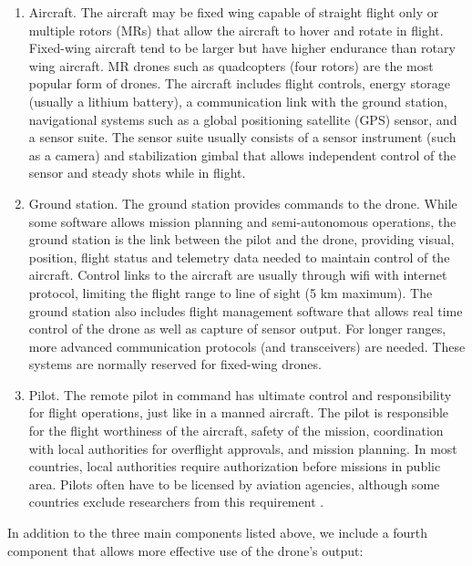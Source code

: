 \begin{enumerate}
\item Aircraft. The aircraft may be fixed wing capable of straight flight only or multiple rotors (MRs) that allow the aircraft to hover and rotate in flight. Fixed-wing aircraft tend to be larger but have higher endurance than rotary wing aircraft. MR drones such as quadcopters (four rotors) are the most popular form of drones. The aircraft includes flight controls, energy storage (usually a lithium battery), a communication link with the ground station, navigational systems such as a global positioning satellite (GPS) sensor, and a sensor suite. The sensor suite usually consists of a sensor instrument (such as a camera) and stabilization gimbal that allows independent control of the sensor and steady shots while in flight. 

\item Ground station. The ground station provides commands to the drone. While some software allows mission planning and semi-autonomous operations, the ground station is the link between the pilot and the drone, providing visual, position, flight status and telemetry data needed to maintain control of the aircraft. Control links to the aircraft are usually through wifi with internet protocol, limiting the flight range to line of sight (5 km maximum). The ground station also includes flight management software that allows real time control of the drone as well as capture of sensor output. For longer ranges, more advanced communication protocols (and transceivers) are needed. These systems are normally reserved for fixed-wing drones.

\item Pilot. The remote pilot in command has ultimate control and responsibility for flight operations, just like in a manned aircraft. The pilot is responsible for the flight worthiness of the aircraft, safety of the mission, coordination with local authorities for overflight approvals, and mission planning. In most countries, local authorities require authorization before missions in public area. Pilots often have to be licensed by aviation agencies, although some countries exclude researchers from this requirement \citep{UAVCoach2017}.

\end{enumerate}

In addition to the three main components listed above, we include a fourth component that allows more effective use of the drone's output:

